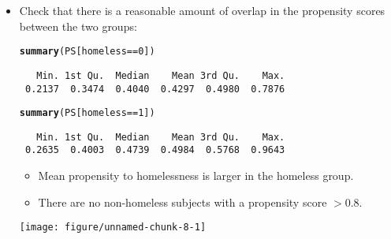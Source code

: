 \documentclass[oneside]{book}\usepackage[]{graphicx}\usepackage[svgnames]{xcolor}
\makeatletter
\def\maxwidth{ %
  \ifdim\Gin@nat@width>\linewidth
    \linewidth
  \else
    \Gin@nat@width
  \fi
}
\newcommand{\hlnum}[1]{\textcolor[rgb]{0.686,0.059,0.569}{#1}}%
\newcommand{\hlopt}[1]{\textcolor[rgb]{0,0,0}{#1}}%
\newcommand{\hlstd}[1]{\textcolor[rgb]{0.345,0.345,0.345}{#1}}%
\newcommand{\hlkwd}[1]{\textcolor[rgb]{0.737,0.353,0.396}{\textbf{#1}}}%
\newenvironment{kframe}{%
 \def\at@end@of@kframe{}%
 \ifinner\ifhmode%
  \def\at@end@of@kframe{\end{minipage}}%
  \begin{minipage}{\columnwidth}%
 \fi\fi%
 \def\FrameCommand##1{\hskip\@totalleftmargin \hskip-\fboxsep
 \colorbox{shadecolor}{##1}\hskip-\fboxsep
     \hskip-\linewidth \hskip-\@totalleftmargin \hskip\columnwidth}%
 \MakeFramed {\advance\hsize-\width
   \@totalleftmargin\z@ \linewidth\hsize
   \@setminipage}}%
 {\par\unskip\endMakeFramed%
 \at@end@of@kframe}
\newenvironment{knitrout}{}{} %
\makeatother
\begin{document}
\begin{itemize}
\begin{knitrout}
\begin{kframe}
\end{kframe}
\end{knitrout}
      \item Check that there is a reasonable amount of overlap in the
            propensity scores between the two groups:
\begin{knitrout}
\color{fgcolor}\begin{kframe}
\begin{alltt}
\hlkwd{summary}\hlstd{(PS[homeless} \hlopt{==} \hlnum{0}\hlstd{])}
\end{alltt}
\begin{verbatim}
   Min. 1st Qu.  Median    Mean 3rd Qu.    Max. 
 0.2137  0.3474  0.4040  0.4297  0.4980  0.7876 
\end{verbatim}
\begin{alltt}
\hlkwd{summary}\hlstd{(PS[homeless} \hlopt{==} \hlnum{1}\hlstd{])}
\end{alltt}
\begin{verbatim}
   Min. 1st Qu.  Median    Mean 3rd Qu.    Max. 
 0.2635  0.4003  0.4739  0.4984  0.5768  0.9643 
\end{verbatim}
\end{kframe}
\end{knitrout}
            \begin{itemize}
                  \item Mean propensity to homelessness is larger in the homeless
                        group.
                  \item There are no non-homeless subjects with a propensity score
                        $> 0.8$.
            \end{itemize}
\begin{knitrout}
\color{fgcolor}

{\centering \texttt{[image: figure/unnamed-chunk-8-1]} 

}


\end{knitrout}
\end{itemize}
\end{document}
